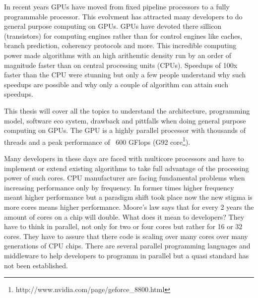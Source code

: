 


In recent years \glspl{GPU} have moved from fixed pipeline  processors to a 
fully programmable processor. This evolvment
has attracted many developers to do general purpose computing on GPUs.
\glspl{GPU} have devoted there sillicon (transistors) for computing engines
rather than for control engines like caches, branch prediction, coherency
protocols and more. This incredible computing power made algorithms with an high
arithemtic density run by an order of magnitude faster than on central
processing units (CPUs). Speedups of 100x faster than the CPU were stunning but
only a few people understand why such speedups are possible and why only a
couple of algorithm can attain such speedups.

This thesis will cover all the topics to understand the architecture,
programming model, software eco system, drawback and pittfalls when doing
general purpose computing on GPUs. The \gls{GPU} is a highly parallel processor with
thousands of threads and a peak performance of ~600 GFlops (G92
core\footnote{http://www.nvidia.com/page/geforce\_8800.html}).

Many developers in these days are faced with multicore processors and have to
implement or extend existing algorithms to take full advantage of the
processing power of such cores. CPU manufacturer are facing fundamental problems
when increasing performance only by frequency. In former times higher frequency
meant higher performance but a paradigm shift took place now the new stigma is
more cores means higher performance. Moore's law says that for every 2 years the
amount of cores on a chip will double. What does it mean to developers? They
have to think in parallel, not only for two or four cores but rather for 16 or
32 cores. They have to assure that there code is scaling over many cores over
many generations of CPU chips. There are several parallel programming languages
and middleware to help developers to programm in parallel but a quasi standard
has not been established.

